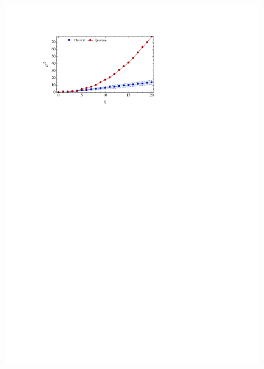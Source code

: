 \documentclass[aps,pra,twocolumn,amsmath,amssymb,nofootinbib,superscriptaddress]{revtex4}
\begin{document}
\begin{figure}[!htb]
\includegraphics[scale=0.88]{VarVsTime.pdf}\\

\end{figure}
\end{document}
